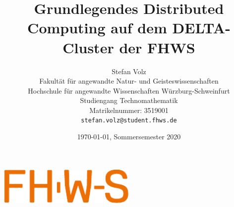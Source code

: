 \newcommand{\cpp}[1]{\texttt|#1|}
\newcommand{\make}[1]{\texttt{#1}}
\newcommand{\bash}[1]{\texttt|#1|}

\title{ Grundlegendes Distributed Computing auf dem DELTA-Cluster der FHWS }

\lhead{}

\author{
  Stefan Volz\\
  Fakultät für angewandte Natur- und Geisteswissenschaften\\
  Hochschule für angewandte Wissenschaften Würzburg-Schweinfurt\\
  Studiengang Technomathematik\\
  Matrikelnummer: 3519001\\
  \texttt{stefan.volz@student.fhws.de}\\
}

\date{\today, Sommersemester 2020}




\begin{center}
  \includegraphics[width=0.5\textwidth]{FHWS}  
\end{center}
